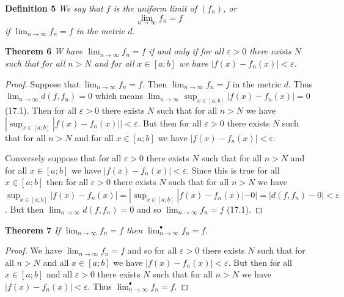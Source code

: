 \documentclass{article}
\begin{document}
\begin{flushleft}
\textbf{Definition 5}
\textsl{We say that $f$ is the uniform limit of $(f_n)$, or
\[
\lim_{n \rightarrow \infty} f_n = f
\]
if $\lim_{n \rightarrow \infty} f_n = f$ in the metric $d$.}\newline

\textbf{Theorem 6}
\textsl{W have $\lim_{n \rightarrow \infty} f_n = f$ if and only if for all $\varepsilon > 0$ there exists $N$ such that for all $n > N$ and for all $x \in [a;b]$ we have $|f(x) - f_n(x)| < \varepsilon$.}
\begin{proof}
Suppose that $\lim_{n \rightarrow \infty} f_n = f$. Then $\lim_{n \rightarrow \infty} f_n = f$ in the metric $d$. Thus $\lim_{n \rightarrow \infty} d(f,f_n) = 0$ which means $\lim_{n \rightarrow \infty} \sup_{x \in [a;b]} |f(x)-f_n(x)| = 0$ (17.1). Then for all $\varepsilon > 0$ there exists $N$ such that for all $n>N$ we have $|\sup_{x \in [a;b]} |f(x)-f_n(x)|| < \varepsilon$. But then for all $\varepsilon > 0$ there exists $N$ such that for all $n>N$ and for all $x \in [a;b]$ we have $|f(x) - f_n(x)| < \varepsilon$.\newline

Conversely suppose that for all $\varepsilon > 0$ there exists $N$ such that for all $n > N$ and for all $x \in [a;b]$ we have $|f(x) - f_n(x)| < \varepsilon$. Since this is true for all $x \in [a;b]$ then for all $\varepsilon > 0$ there exists $N$ such that for all $n>N$ we have $\sup_{x \in [a;b]} |f(x)-f_n(x)| = |\sup_{x \in [a;b]} |f(x)-f_n(x)| - 0| = |d(f,f_n) - 0| < \varepsilon$. But then $\lim_{n \rightarrow \infty} d(f,f_n) = 0$ and so $\lim_{n \rightarrow \infty} f_n = f$ (17.1).
\end{proof}

\textbf{Theorem 7}
\textsl{If $\lim_{n \rightarrow \infty} f_n = f$ then $\lim_{n \rightarrow \infty}^{\bullet} f_n = f$.}
\begin{proof}
We have $\lim_{n \rightarrow \infty} f_n = f$ and so for all $\varepsilon > 0$ there exists $N$ such that for all $n>N$ and all $x \in [a;b]$ we have $|f(x)-f_n(x)| < \varepsilon$. But then for all $x \in [a;b]$ and all $\varepsilon > 0$ there exists $N$ such that for all $n>N$ we have $|f(x)-f_n(x)| < \varepsilon$. Thus $\lim_{n \rightarrow \infty}^{\bullet} f_n = f$.
\end{proof}


\end{flushleft}
\end{document}
